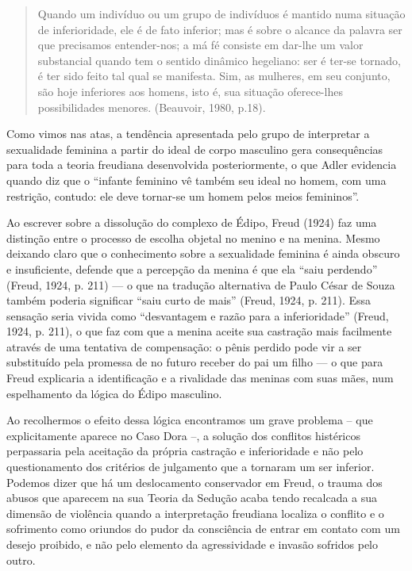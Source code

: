\begin{quote}
Quando um indivíduo ou um grupo de indivíduos é mantido numa situação de
inferioridade, ele é de fato inferior; mas é sobre o alcance da palavra
ser que precisamos entender-nos; a má fé consiste em dar-lhe um valor
substancial quando tem o sentido dinâmico hegeliano: ser é ter-se
tornado, é ter sido feito tal qual se manifesta. Sim, as mulheres, em
seu conjunto, são hoje inferiores aos homens, isto é, sua situação
oferece-lhes possibilidades menores. (Beauvoir, 1980, p.18).
\end{quote}

Como vimos nas atas, a tendência apresentada pelo grupo de interpretar a
sexualidade feminina a partir do ideal de corpo masculino gera
consequências para toda a teoria freudiana desenvolvida posteriormente,
o que Adler evidencia quando diz que o ``infante feminino vê também seu
ideal no homem, com uma restrição, contudo: ele deve tornar-se um homem
pelos meios femininos''.

Ao escrever sobre a dissolução do complexo de Édipo, Freud (1924) faz
uma distinção entre o processo de escolha objetal no menino e na menina.
Mesmo deixando claro que o conhecimento sobre a sexualidade feminina é
ainda obscuro e insuficiente, defende que a percepção da menina é que
ela ``saiu perdendo'' (Freud, 1924, p. 211) --- o que na tradução
alternativa de Paulo César de Souza também poderia significar ``saiu
curto de mais'' (Freud, 1924, p. 211). Essa sensação seria vivida como
``desvantagem e razão para a inferioridade'' (Freud, 1924, p. 211), o que
faz com que a menina aceite sua castração mais facilmente através de uma
tentativa de compensação: o pênis perdido pode vir a ser substituído
pela promessa de no futuro receber do pai um filho --- o que para Freud
explicaria a identificação e a rivalidade das meninas com suas mães, num
espelhamento da lógica do Édipo masculino.

Ao recolhermos o efeito dessa lógica encontramos um grave problema --
que explicitamente aparece no Caso Dora --, a solução dos conflitos
histéricos perpassaria pela aceitação da própria castração e
inferioridade e não pelo questionamento dos critérios de julgamento que
a tornaram um ser inferior. Podemos dizer que há um deslocamento
conservador em Freud, o trauma dos abusos que aparecem na sua Teoria da
Sedução acaba tendo recalcada a sua dimensão de violência quando a
interpretação freudiana localiza o conflito e o sofrimento como oriundos
do pudor da consciência de entrar em contato com um desejo proibido, e
não pelo elemento da agressividade e invasão sofridos pelo outro.


